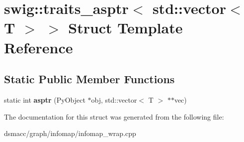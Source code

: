 \hypertarget{structswig_1_1traits__asptr_3_01std_1_1vector_3_01T_01_4_01_4}{}\section{swig\+:\+:traits\+\_\+asptr$<$ std\+:\+:vector$<$ T $>$ $>$ Struct Template Reference}
\label{structswig_1_1traits__asptr_3_01std_1_1vector_3_01T_01_4_01_4}
\subsection*{Static Public Member Functions}
\begin{DoxyCompactItemize}
\item 
\mbox{\label{structswig_1_1traits__asptr_3_01std_1_1vector_3_01T_01_4_01_4_abffecd25e704a44cd75d02ccde1efbe4}} 
static int {\bfseries asptr} (Py\+Object $\ast$obj, std\+::vector$<$ T $>$ $\ast$$\ast$vec)
\end{DoxyCompactItemize}


The documentation for this struct was generated from the following file\+:\begin{DoxyCompactItemize}
\item 
dsmacc/graph/infomap/infomap\+\_\+wrap.\+cpp\end{DoxyCompactItemize}
